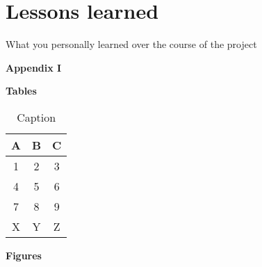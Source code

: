 \documentclass[11pt,a4paper]{article}
\begin{document}
\newpage

\section{Lessons learned} \label{lessons-learned}

What you personally learned over the course of the project

%
%

\newpage

\noindent\Large{\textbf{Appendix I}} \label{appendix-i}

\newpage

\noindent\textbf{\Large{Tables}}

\begin{table}[h!]
    \centering
    \caption{Caption}
    \label{tab-label}
    \begin{tabular}{|c|c|c|}
        \hline
        A&
        B&
        C\\
        \hline
        1&2&3\\
        \hline
        4&5&6\\
        \hline
        7&8&9\\
        \hline
        X&Y&Z\\
        \hline
    \end{tabular}
\end{table}

\newpage

\noindent\textbf{\Large{Figures}}

\end{document}
